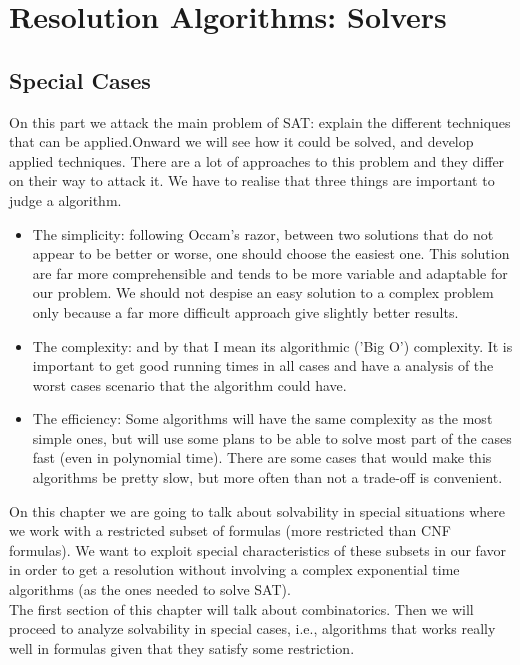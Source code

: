 
\part{Resolution Algorithms: Solvers}
\label{chap:2}


\chapter{Special Cases}

On this part we attack the main problem of SAT: explain the different techniques that can be applied.Onward we will see how it could be solved, and develop applied techniques. There are a lot of approaches to this problem and they differ on their way to attack it. We have to realise that three things are important to judge a algorithm.

\begin{itemize}
\item The simplicity: following Occam's razor, between two solutions that do not appear to be better or worse, one should choose the easiest one. This solution are far more comprehensible and tends to be more variable and adaptable for our problem. We should not despise an easy solution to a complex problem only because a far more difficult approach give slightly better results.

\item The complexity: and by that I mean its algorithmic ('Big O') complexity. It is important to get good running times in all cases and have a analysis of the worst cases scenario that the algorithm could have.

\item The efficiency: Some algorithms will have the same complexity as the most simple ones, but will use some plans to be able to solve most part of the cases fast (even in polynomial time). There are some cases that would make this algorithms be pretty slow, but more often than not a trade-off is convenient.
\end{itemize}


  On this chapter we are going to talk about solvability in special situations where we work with a restricted subset of formulas (more restricted than CNF formulas). We want to exploit special characteristics of these subsets in our favor in order to get a resolution without involving a complex exponential time algorithms (as the ones needed to solve SAT).\\


  The first section of this chapter will talk about combinatorics. Then we will proceed to analyze solvability in special cases, i.e., algorithms  that works really well in formulas given that they satisfy some restriction.


